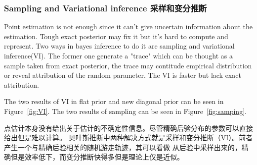\documentclass{article}
\begin{document}
\subsubsection{Sampling and Variational inference 采样和变分推断}

Point estimation is not enough since it can't give uncertain information about the estimation.
Tough exact posterior may fix it but it's hard to compute and represent. Two ways in bayes inference 
to do it are sampling and variational inference(VI). The former one generate a "trace" which can be thought
as a sample taken from exact posterior, the trace may contitude empirical distribution or reveal 
attribution of the random parameter. The VI is faster but lack exact attribution.

The two results of VI in flat prior and new diagonal prior can be seen in Figure~\ref{fig:VI}.
The two results of sampling can be seen in Figure~\ref{fig:samping}.

点估计本身没有给出关于估计的不确定性信息。尽管精确后验分布的参数可以直接给出但是难以计算。
贝叶斯推断中两种解决方式就是采样和变分推断（VI）。前者产生一个与精确后验相关的随机游走轨迹，其可以看做
从后验中采样出来的，精确但是效率低下，而变分推断快得多但是理论上仅是近似。
\end{document}
